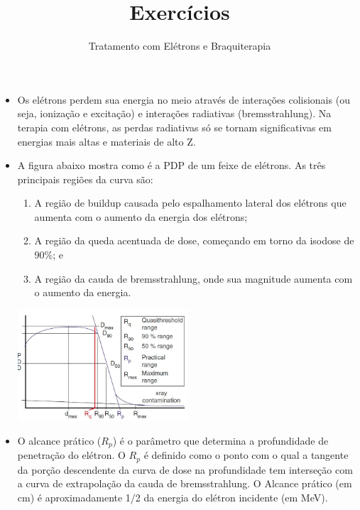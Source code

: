 \documentclass[11pt,a4paper]{article}
\title{\LobsterTwo\Huge{Exercícios}}
\author{\LobsterTwo\Large{Tratamento com Elétrons e Braquiterapia \nocite{*}}}
\date{\LobsterTwo{Dalila Mendonça}}
\newcounter{exemplo}
\begin{document}
	\maketitle


\begin{exemplo}
    \begin{itemize}
        \item Os elétrons perdem sua energia no meio através de interações colisionais (ou seja, ionização e excitação) e interações radiativas (bremsstrahlung). Na terapia com elétrons, as perdas radiativas só se tornam significativas em energias mais altas e materiais de alto Z.
        
        \item A figura abaixo mostra como é a PDP de um feixe de elétrons. As três principais regiões da curva são:
        
            \begin{enumerate}[label=label=\textcolor{CarnationPink}{\roman*.}]
                \item A região de buildup causada pelo espalhamento lateral dos elétrons que aumenta com o aumento da energia dos elétrons;
                \item A região da queda acentuada de dose, começando em torno da isodose de 90\%; e 
                \item A região da cauda de bremsstrahlung, onde sua magnitude aumenta com o aumento da energia.
            \end{enumerate}
        
            \begin{center}
                \includegraphics[width=0.5\textwidth]{Imagens/pdpEletrons.JPG}
            \end{center}

        \item O alcance prático ($R_p$) é o parâmetro que determina a profundidade de penetração do elétron. O $R_p$ é definido como o ponto com o qual a tangente da porção descendente da curva de dose na profundidade tem interseção com a curva de extrapolação da cauda de bremsstrahlung. O Alcance prático (em cm) é aproximadamente 1/2 da energia do elétron incidente (em MeV).
        

\end{itemize}
\end{exemplo}
\end{document}
